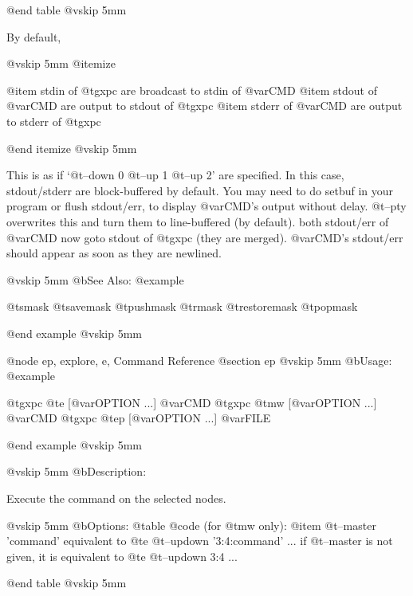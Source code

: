 @end table
@vskip 5mm

By default,

@vskip 5mm
@itemize

@item  stdin of @t{gxpc} are broadcast to stdin of @var{CMD}
@item  stdout of @var{CMD} are output to stdout of @t{gxpc}
@item  stderr of @var{CMD} are output to stderr of @t{gxpc}

@end itemize
@vskip 5mm

This is as if `@t{--down} 0 @t{--up} 1 @t{--up} 2' are specified.  In this
case, stdout/stderr are block-buffered by default.  You may need
to do setbuf in your program or flush stdout/err, to display
@var{CMD}'s output without delay.  @t{--pty} overwrites this and turn them
to line-buffered (by default).  both stdout/err of @var{CMD} now goto
stdout of @t{gxpc} (they are merged).  @var{CMD}'s stdout/err should appear
as soon as they are newlined.

@vskip 5mm
@b{See Also:}
@example

  @t{smask} @t{savemask} @t{pushmask} @t{rmask} @t{restoremask} @t{popmask}

@end example
@vskip 5mm

@node ep, explore, e, Command Reference
@section ep
@vskip 5mm
@b{Usage:}
@example

  @t{gxpc} @t{e}  [@var{OPTION} ...] @var{CMD}
  @t{gxpc} @t{mw} [@var{OPTION} ...] @var{CMD}
  @t{gxpc} @t{ep} [@var{OPTION} ...] @var{FILE}

@end example
@vskip 5mm

@vskip 5mm
@b{Description:}


  Execute the command on the selected nodes.

@vskip 5mm
@b{Options: }
@table @code
(for @t{mw} only):
@item   @t{--master} 'command'
    equivalent to @t{e} @t{--updown} '3:4:command' ...
  if @t{--master} is not given, it is equivalent to @t{e} @t{--updown} 3:4 ...

@end table
@vskip 5mm

